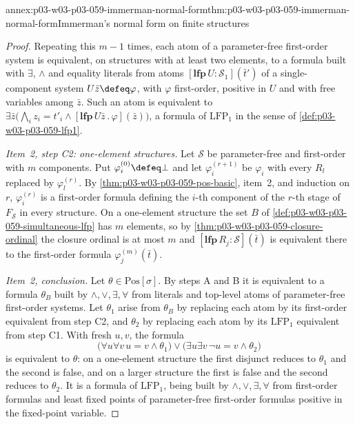 \begin{annexitem}{annex:p03-w03-p03-059-immerman-normal-form}{thm:p03-w03-p03-059-immerman-normal-form}{Immerman's normal form on finite structures}
\begin{proof}
Repeating this \(m-1\) times, each atom of a parameter-free first-order
system is equivalent, on structures with at least two elements, to a
formula built with \(\exists\), \(\land\) and equality literals from atoms
\([\mathbf{lfp}\,U:\mathcal S_1](\bar t')\) of a single-component system
\(U\bar z\defeq\varphi\), with \(\varphi\) first-order, positive in \(U\)
and with free variables among \(\bar z\). Such an atom is equivalent to
\(\exists\bar z\bigl(\bigwedge_i z_i=t'_i\land
[\mathbf{lfp}\,U\bar z\,.\,\varphi](\bar z)\bigr)\), a formula of
\(\mathrm{LFP}_1\) in the sense of \cref{def:p03-w03-p03-059-lfp1}.

\emph{Item~2, step C2: one-element structures.} Let \(\mathcal S\) be
parameter-free and first-order with \(m\) components. Put
\(\varphi_i^{(0)}\defeq\bot\) and let \(\varphi_i^{(r+1)}\) be
\(\varphi_i\) with every \(R_l\) replaced by \(\varphi_l^{(r)}\). By
\cref{thm:p03-w03-p03-059-pos-basic}, item~2, and induction on \(r\),
\(\varphi_i^{(r)}\) is a first-order formula defining the \(i\)-th
component of the \(r\)-th stage of \(F_{\mathcal S}\) in every structure.
On a one-element structure the set \(B\) of
\cref{def:p03-w03-p03-059-simultaneous-lfp} has \(m\) elements, so by
\cref{thm:p03-w03-p03-059-closure-ordinal} the closure ordinal is at most
\(m\) and \([\mathbf{lfp}\,R_j:\mathcal S](\bar t)\) is equivalent there to
the first-order formula \(\varphi_j^{(m)}(\bar t)\).

\emph{Item~2, conclusion.} Let \(\theta\in\mathrm{Pos}[\sigma]\). By steps
A and B it is equivalent to a formula \(\theta_B\) built by \(\land,\lor,
\exists,\forall\) from literals and top-level atoms of parameter-free
first-order systems. Let \(\theta_1\) arise from \(\theta_B\) by replacing
each atom by its first-order equivalent from step C2, and \(\theta_2\) by
replacing each atom by its \(\mathrm{LFP}_1\) equivalent from step C1. With
fresh \(u,v\), the formula
\[
 \bigl(\forall u\forall v\,u=v\land\theta_1\bigr)\lor
 \bigl(\exists u\exists v\,\neg u=v\land\theta_2\bigr)
\]
is equivalent to \(\theta\): on a one-element structure the first disjunct
reduces to \(\theta_1\) and the second is false, and on a larger structure
the first is false and the second reduces to \(\theta_2\). It is a formula
of \(\mathrm{LFP}_1\), being built by \(\land,\lor,\exists,\forall\) from
first-order formulas and least fixed points of parameter-free first-order
formulas positive in the fixed-point variable.


\end{proof}
\end{annexitem}
